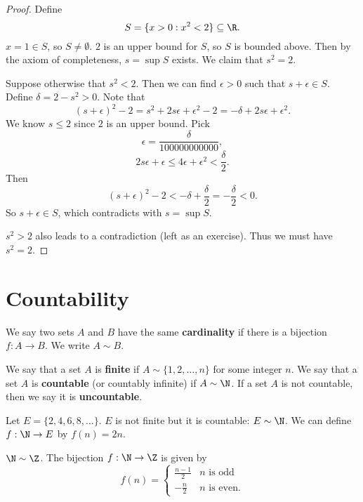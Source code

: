 \begin{proof}
  Define
  \[S = \{x > 0 : x^2 < 2\} \subseteq \R.\]
  $x = 1 \in S$, so $S \ne \emptyset$. $2$ is an upper
  bound for $S$, so $S$ is bounded above. Then by the
  axiom of completeness, $s = \sup S$ exists.
  We claim that $s^2 = 2$. 

  Suppose otherwise that $s^2 < 2$. Then we can find
  $\epsilon > 0$ such that $s + \epsilon \in S$.
  Define $\delta = 2 - s^2 > 0$. Note that
  \[(s + \epsilon)^2 - 2 = s^2 + 2s\epsilon + \epsilon^2 - 2 = -\delta + 2s\epsilon + \epsilon^2.\]
  We know $s \le 2$ since $2$ is an upper bound. 
  Pick
  \[\epsilon = \frac{\delta}{100000000000},\]
  \[
  2s\epsilon + \epsilon \le 4\epsilon + \epsilon^2 < \frac{\delta}{2}
  .\]
  Then
  \[
  (s + \epsilon)^2 - 2 < -\delta + \frac{\delta}{2}
  = -\frac{\delta}{2} < 0
  .\]
  So $s + \epsilon \in S$, which contradicts with
  $s = \sup S$.

  $s^2 > 2$ also leads to a contradiction
  (left as an exercise). Thus we must have $s^2 = 2$.
\end{proof}

\section{Countability}
\begin{definition}
  We say two sets $A$ and $B$ have the same
  \textbf{cardinality}
  if there is a bijection $f : A \to B$.
  We write $A \sim B$.
\end{definition}

\begin{definition}
  We say that a set $A$  is \textbf{finite} if
  $A \sim \{1, 2, \dots, n\}$ for some integer $n$.
  We say that a set $A$ is \textbf{countable}
  (or countably infinite) if
  $A \sim \N$.
  If a set $A$ is not countable, then we say it is
  \textbf{uncountable}.
\end{definition}

\begin{example}
  Let $E = \{2, 4, 6, 8, \dots\}$.
  $E$ is not finite but it is countable: $E \sim \N$.
  We can define $f : \N \to E$ by $f(n) = 2n$.
\end{example}

\begin{example}
  $\N \sim \Z$. 
  The bijection $f : \N \to \Z$ is given by
  \[
  f(n) =
  \begin{cases}
    \frac{n-1}{2} & \text{$n$ is odd} \\
    -\frac{n}{2} & \text{$n$ is even}.
  \end{cases}
  \]
\end{example}

